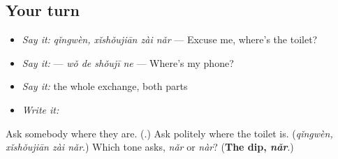 \subsection*{Your turn}
\begin{itemize}
\raggedright
  \item \emph{Say it:} \emph{qǐngwèn, xǐshǒujiān zài nǎr} — Excuse me, where's the toilet?
  \item \emph{Say it:}  — \emph{wǒ de shǒujī ne} — Where's my phone?
  \item \emph{Say it:} the whole exchange, both parts
  \item \emph{Write it:} 
\end{itemize}

\begin{tcolorbox}[breakable,colback=teal!4,colframe=teal!35!black,title={Before you move on}]
Ask somebody where they are. (\textbf{}.) Ask politely where the toilet is. (\emph{qǐngwèn, xǐshǒujiān zài nǎr}.) Which tone asks, \emph{nǎr} or \emph{nàr}? (\textbf{The dip, \emph{nǎr}}.)
\end{tcolorbox}
